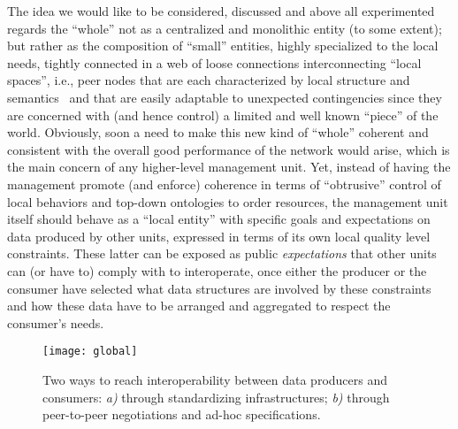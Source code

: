 \documentclass{article}
\begin{document}
The idea we would like to be considered, discussed and above all experimented regards the ``whole'' not as a centralized and monolithic entity (to some extent); but rather as the composition of ``small'' entities, highly specialized to the local needs, tightly connected in a web of loose connections interconnecting ``local spaces'', i.e., peer nodes that are each characterized by local structure and semantics~\citep{bandini_www_2007} and that are easily adaptable to unexpected contingencies since they are concerned with (and hence control) a limited and well known ``piece'' of the world. Obviously, soon a need to make this new kind of ``whole'' coherent and consistent with the overall good performance of the network would arise, which is the main concern of any higher-level management unit. Yet, instead of having the management promote (and enforce) coherence in terms of ``obtrusive'' control of local behaviors and top-down ontologies to order resources, the management unit itself should behave as a ``local entity'' with specific goals and expectations on data produced by other units, expressed in terms of its own local quality level constraints. These latter can be exposed as public \emph{expectations} that other units can (or have to) comply with to interoperate, once either the producer or the consumer have selected what data structures are involved by these constraints and how these data have to be arranged and aggregated to respect the consumer's needs. 

\begin{figure}[tbh]
  \centering
      \texttt{[image: global]}
  \caption{Two ways to reach interoperability between data producers and consumers: \textit{a)} through standardizing infrastructures; \textit{b)} through peer-to-peer negotiations and ad-hoc specifications.}
  \label{img:global}
\end{figure}
\end{document}
